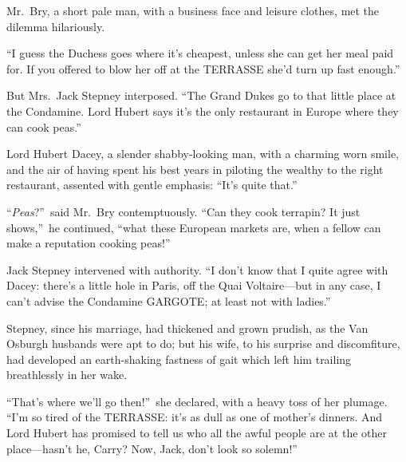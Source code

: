 \documentclass[12pt,a4paper]{book}
\begin{document}
Mr.\ Bry, a short pale man, with a business face and leisure
clothes, met the dilemma hilariously.





``I guess the Duchess goes where it's cheapest, unless she can get
her meal paid for. If you offered to blow her off at the TERRASSE
she'd turn up fast enough.''





But Mrs.\ Jack Stepney interposed. ``The Grand Dukes go to that
little place at the Condamine. Lord Hubert says it's the only
restaurant in Europe where they can cook peas.''





Lord Hubert Dacey, a slender shabby-looking man, with a charming
worn smile, and the air of having spent his best years in
piloting the wealthy to the right restaurant, assented with
gentle emphasis: ``It's quite that.''





``\textit{Peas}?''\ said Mr.\ Bry contemptuously. ``Can they cook terrapin? It
just shows,''\ he continued, ``what these European markets are, when
a fellow can make a reputation cooking peas!''





Jack Stepney intervened with authority. ``I don't know that I
quite agree with Dacey: there's a little hole in Paris, off the
Quai Voltaire---but in any case, I can't advise the Condamine
GARGOTE; at least not with ladies.''





Stepney, since his marriage, had thickened and grown prudish, as
the Van Osburgh husbands were apt to do; but his wife, to his
surprise and discomfiture, had developed an earth-shaking
fastness of gait which left him trailing breathlessly in her
wake.





``That's where we'll go then!''\ she declared, with a heavy toss of
her plumage. ``I'm so tired of the TERRASSE: it's as dull as one
of mother's dinners. And Lord Hubert has promised to tell us who
all the awful people are at the other place---hasn't he, Carry? 
Now, Jack, don't look so solemn!''
\end{document}
